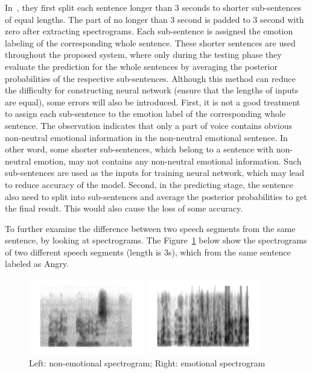 \documentclass[a4paper]{article}
\begin{document}
In~\cite{satt2017}, they first split each sentence longer than 3 seconds to shorter sub-sentences of equal lengths. The part of no longer than 3 second is padded to 3 second with zero after extracting spectrograms. Each sub-sentence is assigned the emotion labeling of the corresponding whole sentence. These shorter sentences are used throughout the proposed system, where only during the testing phase they evaluate the prediction for the whole sentences by averaging the posterior probabilities of the respective sub-sentences. Although this method can reduce the difficulty for constructing neural network (ensure that the lengths of inputs are equal), some errors will also be introduced. First, it is not a good treatment to assign each sub-sentence to the emotion label of the corresponding whole sentence. The observation indicates that only a part of voice contains obvious non-neutral emotional information in the non-neutral emotional sentence. In other word, some shorter sub-sentences, which belong to a sentence with non-neutral emotion, may not contains any non-neutral emotional information. Such sub-sentences are used as the inputs for training neural network, which may lead to reduce accuracy of the model. Second, in the predicting stage, the sentence also need to split into sub-sentences and average the posterior probabilities to get the final result. This would also cause the loss of some accuracy. 

To further examine the difference between two speech segments from the same sentence, by looking at spectrograms. The Figure~\ref{fig:spectrogram} below show the spectrograms of two different speech segments (length is 3s), which from the same sentence labeled as Angry.

\begin{figure}[htb]
\begin{minipage}[b]{.48\linewidth}
  \centering
  \centerline{\includegraphics[width=5.0cm]{neu}}
\end{minipage}
\hfill
\begin{minipage}[b]{0.48\linewidth}
  \centering
  \centerline{\includegraphics[width=5.0cm]{ang}}
\end{minipage}
%
\caption{Left: non-emotional spectrogram; Right: emotional spectrogram}
\label{fig:spectrogram}
\end{figure}
\end{document}
